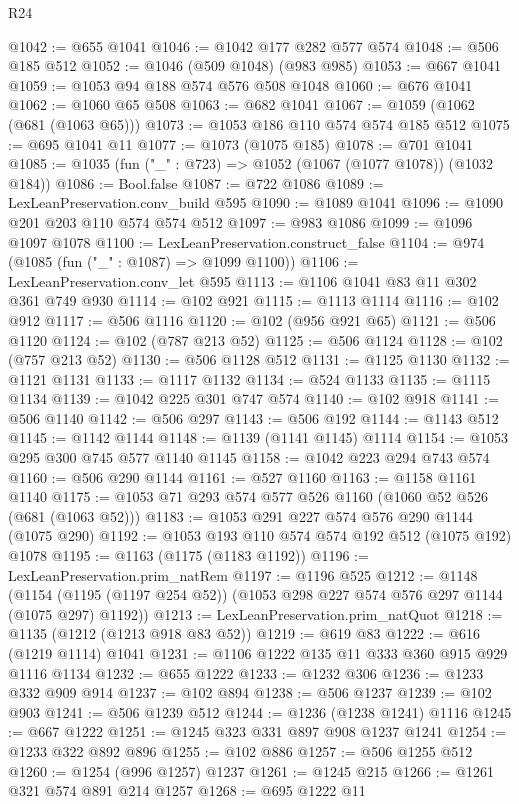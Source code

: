 \begin{lexlean}{R24}
\begin{coremodule}
@1042 := @655 @1041
@1046 := @1042 @177 @282 @577 @574
@1048 := @506 @185 @512
@1052 := @1046 (@509 @1048) (@983 @985)
@1053 := @667 @1041
@1059 := @1053 @94 @188 @574 @576 @508 @1048
@1060 := @676 @1041
@1062 := @1060 @65 @508
@1063 := @682 @1041
@1067 := @1059 (@1062 (@681 (@1063 @65)))
@1073 := @1053 @186 @110 @574 @574 @185 @512
@1075 := @695 @1041 @11
@1077 := @1073 (@1075 @185)
@1078 := @701 @1041
@1085 := @1035 (fun ("_" : @723) => @1052 (@1067 (@1077 @1078)) (@1032 @184))
@1086 := Bool.false
@1087 := @722 @1086
@1089 := LexLeanPreservation.conv_build @595
@1090 := @1089 @1041
@1096 := @1090 @201 @203 @110 @574 @574 @512
@1097 := @983 @1086
@1099 := @1096 @1097 @1078
@1100 := LexLeanPreservation.construct_false
@1104 := @974 (@1085 (fun ("_" : @1087) => @1099 @1100))
@1106 := LexLeanPreservation.conv_let @595
@1113 := @1106 @1041 @83 @11 @302 @361 @749 @930
@1114 := @102 @921
@1115 := @1113 @1114
@1116 := @102 @912
@1117 := @506 @1116
@1120 := @102 (@956 @921 @65)
@1121 := @506 @1120
@1124 := @102 (@787 @213 @52)
@1125 := @506 @1124
@1128 := @102 (@757 @213 @52)
@1130 := @506 @1128 @512
@1131 := @1125 @1130
@1132 := @1121 @1131
@1133 := @1117 @1132
@1134 := @524 @1133
@1135 := @1115 @1134
@1139 := @1042 @225 @301 @747 @574
@1140 := @102 @918
@1141 := @506 @1140
@1142 := @506 @297
@1143 := @506 @192
@1144 := @1143 @512
@1145 := @1142 @1144
@1148 := @1139 (@1141 @1145) @1114
@1154 := @1053 @295 @300 @745 @577 @1140 @1145
@1158 := @1042 @223 @294 @743 @574
@1160 := @506 @290 @1144
@1161 := @527 @1160
@1163 := @1158 @1161 @1140
@1175 := @1053 @71 @293 @574 @577 @526 @1160 (@1060 @52 @526 (@681 (@1063 @52)))
@1183 := @1053 @291 @227 @574 @576 @290 @1144 (@1075 @290)
@1192 := @1053 @193 @110 @574 @574 @192 @512 (@1075 @192) @1078
@1195 := @1163 (@1175 (@1183 @1192))
@1196 := LexLeanPreservation.prim_natRem
@1197 := @1196 @525
@1212 := @1148
    (@1154 (@1195 (@1197 @254 @52)) (@1053 @298 @227 @574 @576 @297 @1144 (@1075 @297) @1192))
@1213 := LexLeanPreservation.prim_natQuot
@1218 := @1135 (@1212 (@1213 @918 @83 @52))
@1219 := @619 @83
@1222 := @616 (@1219 @1114) @1041
@1231 := @1106 @1222 @135 @11 @333 @360 @915 @929 @1116 @1134
@1232 := @655 @1222
@1233 := @1232 @306
@1236 := @1233 @332 @909 @914
@1237 := @102 @894
@1238 := @506 @1237
@1239 := @102 @903
@1241 := @506 @1239 @512
@1244 := @1236 (@1238 @1241) @1116
@1245 := @667 @1222
@1251 := @1245 @323 @331 @897 @908 @1237 @1241
@1254 := @1233 @322 @892 @896
@1255 := @102 @886
@1257 := @506 @1255 @512
@1260 := @1254 (@996 @1257) @1237
@1261 := @1245 @215
@1266 := @1261 @321 @574 @891 @214 @1257
@1268 := @695 @1222 @11

\end{coremodule}
\end{lexlean}
